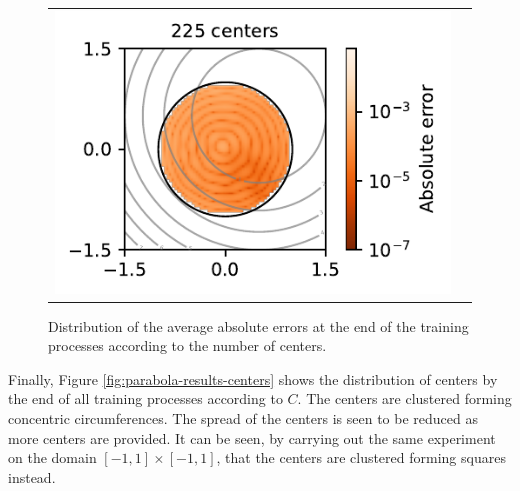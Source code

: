 \documentclass[12pt]{report} %
\begin{document}
\begin{figure}
\begin{tabular}{ccl}
    \multicolumn{2}{l}{\includegraphics[width=.4\textwidth, clip=true,trim={0 0 2.1cm 0}]{imagenes/experiments/2d/statistical_2d_full_scheduler_interpolation/parabola/parabola_225.pdf}} &
  \end{tabular}
  \caption{Distribution of the average absolute errors at the end of the training processes according to the number of centers.}
  \label{fig:parabola-results-largest-errors}
\end{figure}




Finally,
Figure \ref{fig:parabola-results-centers} shows the distribution of centers by the end of all training processes according to $C$. The centers are clustered forming concentric circumferences. The spread of the centers is seen to be reduced as more centers are provided. It can be seen, by carrying out the same experiment on the domain $[-1,1]\times[-1,1]$, that the centers are clustered forming squares instead.
\end{document}
